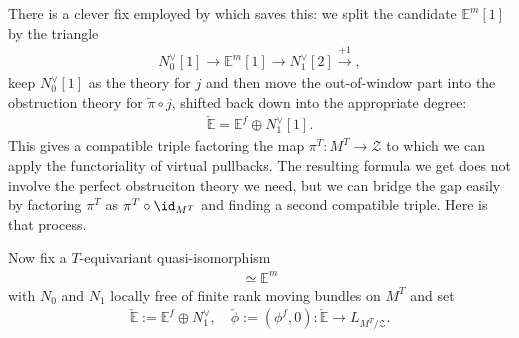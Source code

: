 \documentclass[12pt,dvipsnames]{amsart}
\begin{document}
There is a clever fix employed by \cite{chang-kiem-li_TorusLocalizationWall2017} which saves this: we split the candidate \(\mathbb E^m[1]\) by the triangle
\begin{align*}
  N^\vee_0[1] \to \mathbb E^m[1] \to N^\vee_1[2] \xrightarrow{+1},
\end{align*}
keep \(N^\vee_0[1]\) as the theory for \(j\) and then move the out-of-window part into the obstruction theory for \(\widetilde \pi \circ j\), shifted back down into the appropriate degree:
\begin{align*}
  \check{\mathbb E} = \mathbb E^f\oplus N^\vee_1[1].
\end{align*}
This gives a compatible triple factoring the map \(\pi^T:M^T\to \mathcal Z\) to which we can apply the functoriality of virtual pullbacks. The resulting formula we get does not involve the perfect obstruciton theory we need, but we can bridge the gap easily by factoring \(\pi^T\) as \(\pi^T\circ \id_{M^T}\) and finding a second compatible triple. Here is that process.



Now fix a $T$-equivariant quasi-isomorphism
\begin{align*}
  [N^\vee_1\xrightarrow{d^\vee} N^\vee_0] \simeq \mathbb E^m \tag{degrees -1, 0}
\end{align*}
with \(N_0\) and \(N_1\) locally free of finite rank moving bundles on \(M^T\) and set
\begin{align*}
  \check{\mathbb E} := \mathbb E^f\oplus N^\vee_1, \quad \check \phi:= (\phi^f, 0):\check{\mathbb E} \to L_{M^T/\mathcal Z}.
\end{align*}





\newpage
\end{document}
